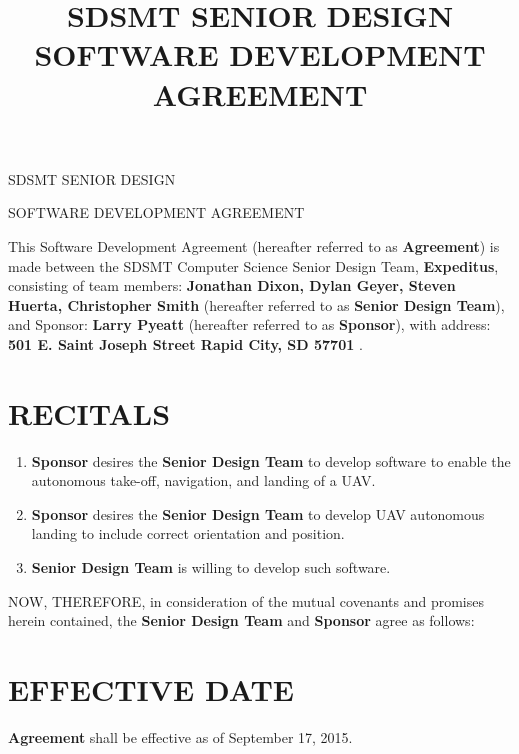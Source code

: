 \documentclass[11pt]{article}
\title{SDSMT SENIOR DESIGN SOFTWARE DEVELOPMENT AGREEMENT}
\begin{document}


{\Large \bf 
\centerline{SDSMT SENIOR DESIGN}\centerline{SOFTWARE DEVELOPMENT AGREEMENT}
}
\vspace{\baselineskip}

This Software Development Agreement (hereafter referred to as \textbf{Agreement}) is made between the SDSMT  Computer Science Senior Design Team, \textbf{Expeditus}, consisting of team members: \textbf{Jonathan Dixon, Dylan Geyer, Steven Huerta, Christopher Smith} (hereafter referred to as \textbf{Senior Design Team}),  and  Sponsor: \textbf{Larry Pyeatt} (hereafter referred to as \textbf{Sponsor}),  with address:  \textbf{501 E. Saint Joseph Street Rapid City, SD 57701} . 



\section{RECITALS}
\begin{enumerate}  \itemsep4pt \parskip0pt 
\item \textbf{Sponsor} desires  the \textbf{Senior Design Team} to develop software to enable the autonomous take-off, navigation, and landing of a UAV.

\item \textbf{Sponsor} desires  the \textbf{Senior Design Team} to develop UAV autonomous landing to include correct orientation and position.

\item \textbf{Senior Design Team} is willing to develop such software.

\end{enumerate}
NOW, THEREFORE, in consideration of the mutual covenants and promises herein contained, the \textbf{Senior Design Team} and \textbf{Sponsor} agree as follows:  

\section{EFFECTIVE DATE }

\textbf{Agreement} shall be effective as of September 17, 2015.  
\end{document}

